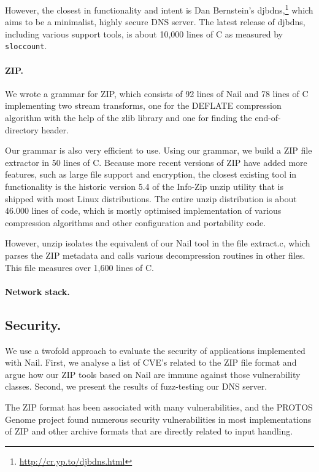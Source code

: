 However, the closest in functionality and intent is Dan Bernstein's
djbdns,\footnote{\url{http://cr.yp.to/djbdns.html}} which aims to be
a minimalist, highly secure DNS server. The latest release of djbdns,
including various support tools, is about 10,000 lines of C as measured by
\texttt{sloccount}. 

\paragraph{ZIP.}


We wrote a grammar for ZIP, which consists of 92 lines of Nail and 78 lines of C implementing two
stream transforms, one for the DEFLATE compression algorithm with the help of the zlib library and
one for finding the end-of-directory header. 

Our grammar is also very efficient to use. Using our grammar, we build a ZIP file extractor in 50
lines of C. Because more recent versions of ZIP have added more features, such as large file support
and encryption, the closest existing tool in functionality is the historic version 5.4 of the Info-Zip unzip
utility\cite{infozip} that is shipped with most Linux distributions. The entire unzip distribution
is about 46.000 lines of code, which is mostly optimised implementation of various compression
algorithms and other configuration and portability code.

However, unzip isolates the equivalent of our Nail tool in the file extract.c, which parses the ZIP
metadata and calls various decompression routines in other files. This file measures over 1,600
lines of C. 

\paragraph{Network stack.}
\subsection{Security.} 
We use a twofold approach to evaluate the security of applications implemented with Nail. First, we
analyse a list of CVE's related to the ZIP file format and argue how our ZIP tools based on Nail are
immune against those vulnerability classes. Second, we present the results of fuzz-testing our DNS
server.

The ZIP format has been associated with many vulnerabilities, and the PROTOS Genome project found numerous
security vulnerabilities in most implementations of ZIP and other archive formats that are directly
related to input handling.


